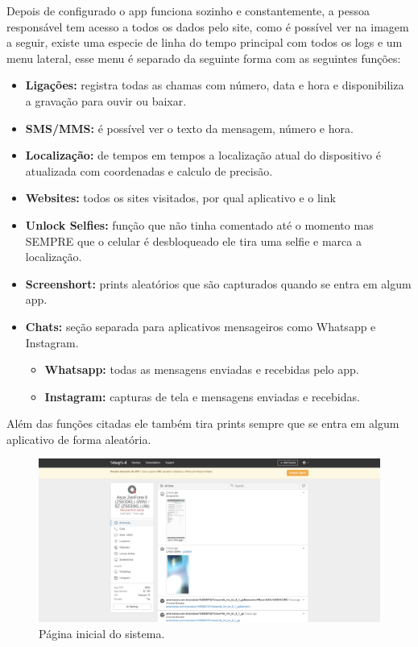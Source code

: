 \documentclass[12pt]{article}
\begin{document}
Depois de configurado o app funciona sozinho e constantemente, a pessoa responsável tem acesso a todos os dados pelo site, como é possível ver na imagem a seguir, existe uma especie de linha do tempo principal com todos os logs e um menu lateral, esse menu é separado da seguinte forma com as seguintes funções:
\begin{itemize}
\item \textbf{Ligações:} registra todas as chamas com número, data e hora e disponibiliza a gravação para ouvir ou baixar.
\item \textbf{SMS/MMS:} é possível ver o texto da mensagem, número e hora.
\item \textbf{Localização:} de tempos em tempos a localização atual do dispositivo é atualizada com coordenadas e calculo de precisão.
\item \textbf{Websites:} todos os sites visitados, por qual aplicativo e o link
\item \textbf{Unlock Selfies:} função que não tinha comentado até o momento mas SEMPRE que o celular é desbloqueado ele tira uma selfie e marca a localização.
\item \textbf{Screenshort:} prints aleatórios que são capturados quando se entra em algum app.
\item \textbf{Chats:} seção separada para aplicativos mensageiros como Whatsapp e Instagram.
\begin{itemize}
    \item \textbf{Whatsapp:} todas as mensagens enviadas e recebidas pelo app.
    \item \textbf{Instagram:} capturas de tela e mensagens enviadas e recebidas.
\end{itemize}
\end{itemize}
Além das funções citadas ele também tira prints sempre que se entra em algum aplicativo de forma aleatória.
\begin{figure}[H]
    \centering
    \includegraphics[width=15cm]{imagem_2021-07-25_190502.png}
    \caption{Página inicial do sistema.}
    \label{fig:fig6}
\end{figure}
\end{document}
